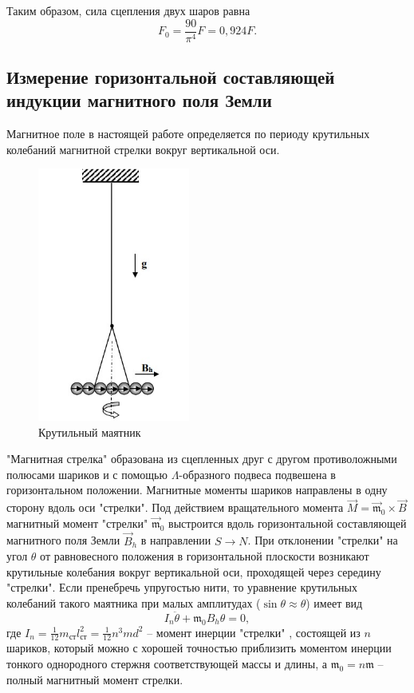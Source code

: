 \documentclass[a4paper,12pt]{article}
\begin{document}
Таким образом, сила сцепления двух шаров равна\[F_0=\frac{90}{\pi^4}F=0,924F.\]
\newpage
\subsection*{Измерение горизонтальной составляющей индукции магнитного поля Земли}

Магнитное поле в настоящей работе определяется по периоду крутильных колебаний магнитной стрелки вокруг вертикальной оси.

\begin{figure}
	\includegraphics[width=5cm]{horizont.jpg}
	\caption{Крутильный маятник}
	\label{mahovik}
\end{figure}

"Магнитная стрелка" образована из сцепленных друг с другом противоложными полюсами шариков и с помощью $\Lambda$-образного подвеса подвешена в горизонтальном положении. Магнитные моменты шариков направлены в одну сторону вдоль оси "стрелки". Под действием вращательного момента $\vec{M}=\vec{\mathfrak{m}}_0\times\vec{B}$ магнитный момент "стрелки" $\vec{\mathfrak{m}}_0$ выстроится вдоль горизонтальной составляющей магнитного поля Земли $\vec{B}_h$ в направлении $S\to N$. При отклонении "стрелки" на угол $\theta$ от равновесного положения в горизонтальной плоскости возникают крутильные колебания вокруг вертикальной оси, проходящей через середину "стрелки". Если пренебречь упругостью нити, то уравнение крутильных колебаний такого маятника при малых амплитудах ($\sin{\theta}\approx\theta$) имеет вид\[I_n\ddot{\theta}+\mathfrak{m}_0B_h\theta=0,\]где $I_n=\frac{1}{12}m_{\text{ст}}l_{\text{ст}}^2=\frac{1}{12}n^3md^2$ -- момент инерции "стрелки" , состоящей из $n$ шариков, который можно с хорошей точностью приблизить моментом инерции тонкого однородного стержня соответствующей массы и длины, а $\mathfrak{m}_0=n\mathfrak{m}$ -- полный магнитный момент стрелки.
\end{document}
